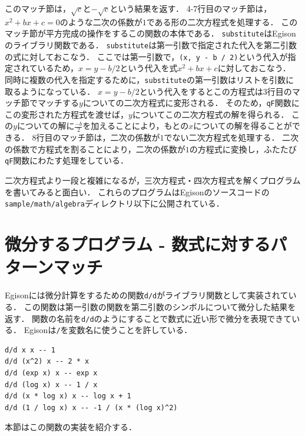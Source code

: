 このマッチ節は，$\sqrt{c}$と$-\sqrt{c}$という結果を返す．
4-7行目のマッチ節は，$x^2 + b x + c = 0$のような二次の係数が$1$である形の二次方程式を処理する．
このマッチ節が平方完成の操作をするこの関数の本体である．
\lstinline{substitute}はEgisonのライブラリ関数である．
\lstinline{substitute}は第一引数で指定された代入を第二引数の式に対しておこなう．
ここでは第一引数で，\lstinline{(x, y - b / 2)}という代入が指定されているため，$x = y - b / 2$という代入を式$x^2 + b x + c$に対しておこなう．
同時に複数の代入を指定するために，\lstinline{substitute}の第一引数はリストを引数に取るようになっている．
$x = y - b / 2$という代入をするとこの方程式は3行目のマッチ節でマッチする$y$についての二次方程式に変形される．
そのため，\lstinline{qF}関数にこの変形された方程式を渡せば，$y$についてこの二次方程式の解を得られる．
この$y$についての解に$\frac{-b}{2}$を加えることにより，もとの$x$についての解を得ることができる．
8行目のマッチ節は，二次の係数が$1$でない二次方程式を処理する．
二次の係数で方程式を割ることにより，二次の係数が$1$の方程式に変換し，ふたたび\lstinline{qF}関数にわたす処理をしている．


二次方程式より一段と複雑になるが，三次方程式・四次方程式を解くプログラムを書いてみると面白い．
これらのプログラムはEgisonのソースコードの\texttt{sample/math/algebra}ディレクトリ以下に公開されている．

\section{微分するプログラム - 数式に対するパターンマッチ}\label{quick2-derivative}

Egisonには微分計算をするための関数\lstinline{d/d}がライブラリ関数として実装されている．
この関数は第一引数の関数を第二引数のシンボルについて微分した結果を返す．
関数の名前を\lstinline{d/d}のようにすることで数式に近い形で微分を表現できている．
Egisonは\lstinline{/}を変数名に使うことを許している．
\begin{lstlisting}[language=egison,numbers=none]
d/d x x -- 1
d/d (x^2) x -- 2 * x
d/d (exp x) x -- exp x
d/d (log x) x -- 1 / x
d/d (x * log x) x -- log x + 1
d/d (1 / log x) x -- -1 / (x * (log x)^2)
\end{lstlisting}
本節はこの関数の実装を紹介する．


